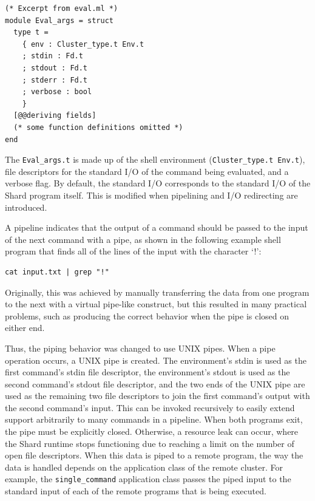 \documentclass[oneside]{report}
\begin{document}
\begin{minipage}[c]{\textwidth-15pt}
  \begin{lstlisting}
(* Excerpt from eval.ml *)
module Eval_args = struct
  type t =
    { env : Cluster_type.t Env.t
    ; stdin : Fd.t
    ; stdout : Fd.t
    ; stderr : Fd.t
    ; verbose : bool
    }
  [@@deriving fields]
  (* some function definitions omitted *)
end
\end{lstlisting}
  \smallskip
\end{minipage}

The \texttt{Eval\_args.t} is made up of the shell environment (\texttt{Cluster\_type.t Env.t}), file descriptors for the standard I/O of the command being evaluated, and a verbose flag.
By default, the standard I/O corresponds to the standard I/O of the Shard program itself.
This is modified when pipelining and I/O redirecting are introduced.

A pipeline indicates that the output of a command should be passed to the input of the next command with a pipe, as shown in the following example shell program that finds all of the lines of the input with the character `!':

\begin{minipage}[c]{\textwidth-15pt}
  \begin{lstlisting}[language=shard]
cat input.txt | grep "!"
\end{lstlisting}
  \smallskip
\end{minipage}

Originally, this was achieved by manually transferring the data from one program to the next with a virtual pipe-like construct, but this resulted in many practical problems, such as producing the correct behavior when the pipe is closed on either end.

Thus, the piping behavior was changed to use UNIX pipes.
When a pipe operation occurs, a UNIX pipe is created.
The environment's stdin is used as the first command's stdin file descriptor, the environment's stdout is used as the second command's stdout file descriptor, and the two ends of the UNIX pipe are used as the remaining two file descriptors to join the first command's output with the second command's input.
This can be invoked recursively to easily extend support arbitrarily to many commands in a pipeline.
When both programs exit, the pipe must be explicitly closed.
Otherwise, a resource leak can occur, where the Shard runtime stops functioning due to reaching a limit on the number of open file descriptors.
When this data is piped to a remote program, the way the data is handled depends on the application class of the remote cluster.
For example, the \texttt{single\_command} application class passes the piped input to the standard input of each of the remote programs that is being executed.
\end{document}
